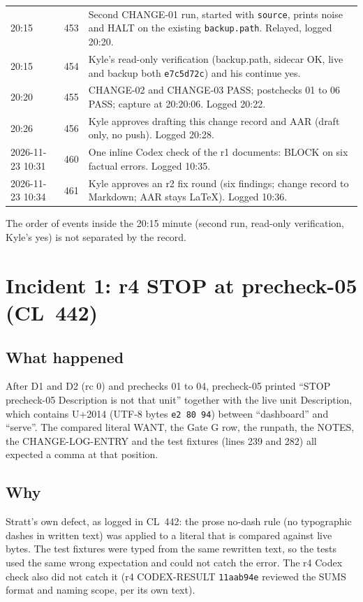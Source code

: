 \documentclass[10pt]{article}
\newcommand{\CL}[1]{CL~#1}
\begin{document}
\begin{longtable}{@{}L{0.85in}L{0.6in}L{4.85in}@{}}
20:15 & 453 & Second CHANGE-01 run, started with \texttt{source}, prints noise and HALT on the existing \texttt{backup.path}. Relayed, logged 20:20. \\
20:15 & 454 & Kyle's read-only verification (backup.path, sidecar OK, live and backup both \texttt{e7c5d72c}) and his continue yes. \\
20:20 & 455 & CHANGE-02 and CHANGE-03 PASS; postchecks 01 to 06 PASS; capture at 20:20:06. Logged 20:22. \\
20:26 & 456 & Kyle approves drafting this change record and AAR (draft only, no push). Logged 20:28. \\
2026-11-23 10:31 & 460 & One inline Codex check of the r1 documents: BLOCK on six factual errors. Logged 10:35. \\
2026-11-23 10:34 & 461 & Kyle approves an r2 fix round (six findings; change record to Markdown; AAR stays LaTeX). Logged 10:36. \\
\bottomrule
\end{longtable}

The order of events inside the 20:15 minute (second run, read-only verification, Kyle's yes) is not separated by the record.

\section{Incident 1: r4 STOP at precheck-05 (\CL{442})}

\subsection{What happened}

After D1 and D2 (rc 0) and prechecks 01 to 04, precheck-05 printed ``STOP precheck-05 Description is not that unit'' together with the live unit Description, which contains U+2014 (UTF-8 bytes \texttt{e2 80 94}) between ``dashboard'' and ``serve''. The compared literal WANT, the Gate G row, the runpath, the NOTES, the CHANGE-LOG-ENTRY and the test fixtures (lines 239 and 282) all expected a comma at that position.

\subsection{Why}

Stratt's own defect, as logged in \CL{442}: the prose no-dash rule (no typographic dashes in written text) was applied to a literal that is compared against live bytes. The test fixtures were typed from the same rewritten text, so the tests used the same wrong expectation and could not catch the error. The r4 Codex check also did not catch it (r4 CODEX-RESULT \texttt{11aab94e} reviewed the SUMS format and naming scope, per its own text).
\end{document}

